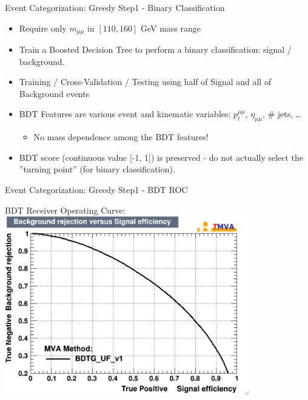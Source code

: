 \documentclass[pdf, 9pt]{beamer}
\newcommand\PlaceText[3]{%
\begin{tikzpicture}[remember picture,overlay]
\node[outer sep=0pt,inner sep=0pt,anchor=south west]
  at ([xshift=#1,yshift=-#2]current page.north west) {#3};
\end{tikzpicture}%
}
\begin{document}
  \begin{frame}{Event Categorization: Greedy Step1 - Binary Classification}
    \begin{itemize}
      \item Require only $m_{\mu\mu}$ in $[110, 160]$ GeV mass range
      \item Train a Boosted Decision Tree to perform a binary classification: signal / background.
      \item Training / Cross-Validation / Testing using half of Signal and all of Background events
      \item BDT Features are various event and kinematic variables: $p_{t}^{\mu\mu}$, $\eta_{\mu\mu}$, \# jets, \dots
        \begin{itemize}
          \item \alert{No mass dependence among the BDT features!}
        \end{itemize}
      \item BDT score (continuous value [-1, 1]) is preserved - do not actually select the ''turning point'' (for binary classification).
    \end{itemize}
  \end{frame}

  \begin{frame}{Event Categorization: Greedy Step1 - BDT ROC}
    \begin{center}
      BDT Receiver Operating Curve:
      \includegraphics[width=0.8\textwidth, height=0.8\textheight]{figs/higgs/bdt_training/BDT_ROC_ge0j_all.pdf}
    \end{center}
  \end{frame}
\end{document}
